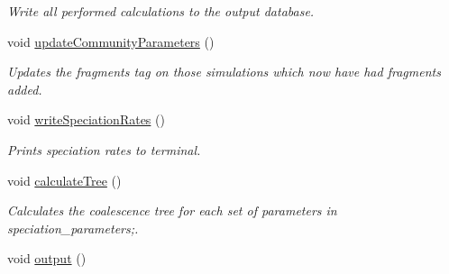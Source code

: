 \begin{DoxyCompactItemize}
\begin{DoxyCompactList}\small\item\em Write all performed calculations to the output database. \end{DoxyCompactList}\item 
void \hyperlink{class_community_af3f5939bfb59fdf3b7d7b5f3699bd225}{update\+Community\+Parameters} ()\hypertarget{class_community_af3f5939bfb59fdf3b7d7b5f3699bd225}{}\label{class_community_af3f5939bfb59fdf3b7d7b5f3699bd225}

\begin{DoxyCompactList}\small\item\em Updates the fragments tag on those simulations which now have had fragments added. \end{DoxyCompactList}\item 
void \hyperlink{class_community_adcfc04e92cbb597682dcc1f2913d6668}{write\+Speciation\+Rates} ()\hypertarget{class_community_adcfc04e92cbb597682dcc1f2913d6668}{}\label{class_community_adcfc04e92cbb597682dcc1f2913d6668}

\begin{DoxyCompactList}\small\item\em Prints speciation rates to terminal. \end{DoxyCompactList}\item 
void \hyperlink{class_community_adfa9a1c84bb326092805614ad195fcdd}{calculate\+Tree} ()\hypertarget{class_community_adfa9a1c84bb326092805614ad195fcdd}{}\label{class_community_adfa9a1c84bb326092805614ad195fcdd}

\begin{DoxyCompactList}\small\item\em Calculates the coalescence tree for each set of parameters in speciation\+\_\+parameters;. \end{DoxyCompactList}\item 
void \hyperlink{class_community_ad2483623c7ad7a11564fc49305204585}{output} ()\hypertarget{class_community_ad2483623c7ad7a11564fc49305204585}{}\label{class_community_ad2483623c7ad7a11564fc49305204585}


\end{DoxyCompactItemize}
